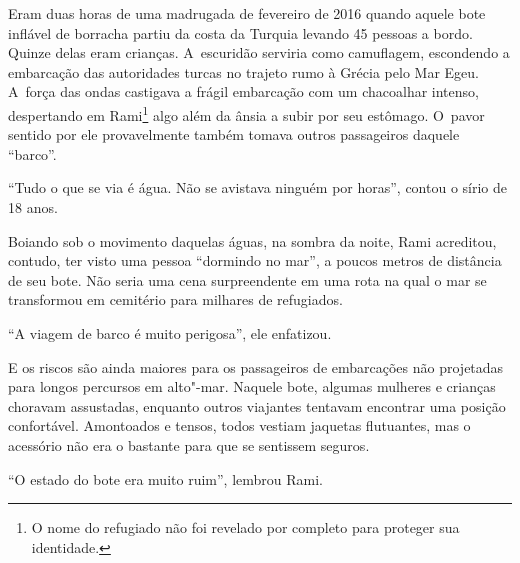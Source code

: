 

\putodd{}

\clearpage

 
% 
% 
Eram duas horas de uma madrugada de fevereiro de 2016 quando aquele bote
inflável de borracha partiu da costa da Turquia levando 45 pessoas a
bordo. Quinze delas eram crianças. A~escuridão serviria como camuflagem,
escondendo a embarcação das autoridades turcas no trajeto rumo à Grécia
pelo Mar Egeu. A~força das ondas castigava a frágil embarcação com um
chacoalhar intenso, despertando em Rami\footnote{ O nome do refugiado não foi revelado por completo
para proteger sua identidade.}  algo além da ânsia a subir por seu estômago. O~pavor sentido por ele provavelmente
também tomava outros passageiros  daquele ``barco''.  



``Tudo o que se via é água. Não se avistava ninguém por horas'', contou o
sírio de 18 anos.

Boiando sob o movimento daquelas águas, na sombra da noite, Rami
acreditou, contudo, ter visto uma pessoa ``dormindo no mar'', a poucos
metros de distância de seu bote. Não seria uma cena surpreendente em uma
rota na qual o mar se transformou em cemitério para milhares de
refugiados.

``A viagem de barco é muito perigosa'', ele enfatizou.

E os riscos são ainda maiores para os passageiros de embarcações não
projetadas para longos percursos em alto"-mar. Naquele bote, algumas
mulheres e crianças choravam assustadas, enquanto outros viajantes
tentavam encontrar uma posição confortável. Amontoados e tensos, todos
vestiam jaquetas flutuantes, mas o acessório não era o bastante para que
se sentissem seguros.

``O estado do bote era muito ruim'', lembrou Rami.

